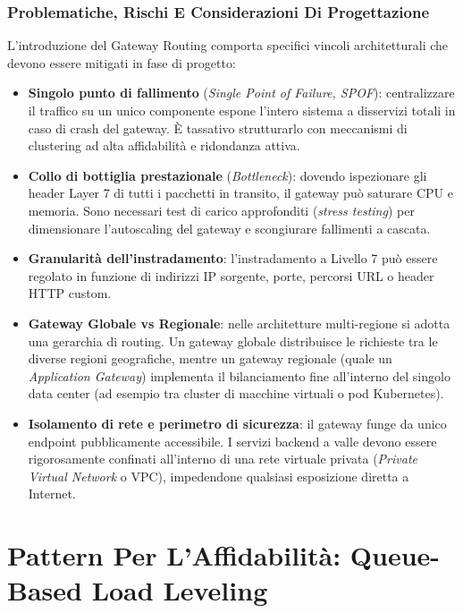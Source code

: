 \documentclass[11pt, a4paper]{article}
\begin{document}
\subsubsection{Problematiche, Rischi E Considerazioni Di Progettazione}

L'introduzione del Gateway Routing comporta specifici vincoli architetturali che devono essere mitigati in fase di progetto:
\begin{itemize}[noitemsep]
    \item \textbf{Singolo punto di fallimento} (\emph{Single Point of Failure, SPOF}): centralizzare il traffico su un unico componente espone l'intero sistema a disservizi totali in caso di crash del gateway. È tassativo strutturarlo con meccanismi di clustering ad alta affidabilità e ridondanza attiva.
    \item \textbf{Collo di bottiglia prestazionale} (\emph{Bottleneck}): dovendo ispezionare gli header Layer 7 di tutti i pacchetti in transito, il gateway può saturare CPU e memoria. Sono necessari test di carico approfonditi (\emph{stress testing}) per dimensionare l'autoscaling del gateway e scongiurare fallimenti a cascata.
    \item \textbf{Granularità dell'instradamento}: l'instradamento a Livello 7 può essere regolato in funzione di indirizzi IP sorgente, porte, percorsi URL o header HTTP custom.
    \item \textbf{Gateway Globale vs Regionale}: nelle architetture multi-regione si adotta una gerarchia di routing. Un gateway globale distribuisce le richieste tra le diverse regioni geografiche, mentre un gateway regionale (quale un \emph{Application Gateway}) implementa il bilanciamento fine all'interno del singolo data center (ad esempio tra cluster di macchine virtuali o pod Kubernetes).
    \item \textbf{Isolamento di rete e perimetro di sicurezza}: il gateway funge da unico endpoint pubblicamente accessibile. I servizi backend a valle devono essere rigorosamente confinati all'interno di una rete virtuale privata (\emph{Private Virtual Network} o VPC), impedendone qualsiasi esposizione diretta a Internet.
\end{itemize}

\newpage

\section{Pattern Per L'Affidabilità: Queue-Based Load Leveling}
\end{document}
